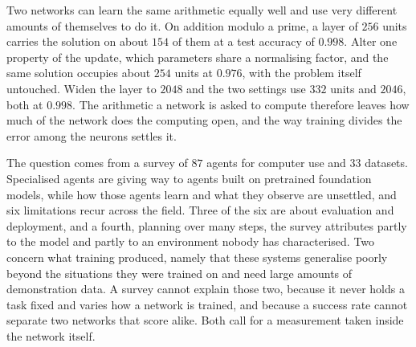 %
%
%
%

Two networks can learn the same arithmetic equally well and use very
different amounts of themselves to do it. On addition modulo a prime, a layer
of $256$ units carries the solution on about $154$ of them at a test accuracy
of $0.998$. Alter one property of the update, which parameters share a
normalising factor, and the same solution occupies about $254$ units at
$0.976$, with the problem itself untouched. Widen the layer to $2048$ and the
two settings use $332$ units and $2046$, both at $0.998$. The arithmetic a
network is asked to compute therefore leaves how much of the network does the
computing open, and the way training divides the error among the neurons
settles it.

The question comes from a survey of $87$ agents for computer use and $33$
datasets. Specialised agents are giving way to agents built on pretrained
foundation models, while how those agents learn and what they observe are
unsettled, and six limitations recur across the field. Three of the six are about evaluation and
deployment, and a fourth, planning over many steps, the survey attributes
partly to the model and partly to an environment nobody has characterised. Two concern what training produced,
namely that these systems generalise poorly beyond the situations they were
trained on and need large amounts of demonstration data.
A survey cannot explain those two, because it never holds a task fixed and
varies how a network is trained, and because a success rate cannot separate
two networks that score alike. Both call for a measurement taken inside the
network itself.

